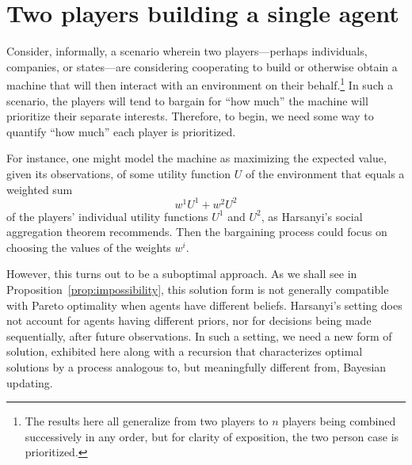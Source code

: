 \documentclass{article}
\newcommand{\bred}[1]{{\color{red}{#1}}}
\newcommand{\prop}[1]{Proposition~\ref{prop:#1}}
\begin{document}
\section{Two players building a single agent}

Consider, informally, a scenario wherein two players---perhaps individuals, companies, or states---are considering cooperating to build or otherwise obtain a machine that will then interact with an environment on their behalf.\footnote{The results here all generalize from two players to $n$ players being combined successively in any order, but for clarity of exposition, the two person case is prioritized.} In such a scenario, the players will tend to bargain for ``how much'' the machine will prioritize their separate interests.  Therefore, to begin, we need some way to quantify ``how much'' each player is prioritized.

For instance, one might model the machine as maximizing the expected value, given its observations, of some utility function $U$ of the environment that equals a weighted sum 
\begin{equation}\label{eqn:harsanyi}
w^1U^1 + w^2U^2
\end{equation}
of the players' individual utility functions $U^1$ and $U^2$, as Harsanyi's social aggregation theorem \citep{harsanyi1980cardinal} recommends.  Then the bargaining process could focus on choosing the values of the weights $w^i$.  

However, this turns out to be a suboptimal approach.  As we shall see in \prop{impossibility}, this solution form is not generally compatible with Pareto optimality when agents have different beliefs.  Harsanyi's setting does not account for agents having different priors, nor for decisions being made sequentially, after future observations.  In such a setting, we need a new form of solution, exhibited here along with a recursion that characterizes optimal solutions by a process analogous to, but meaningfully different from, Bayesian updating.
\end{document}
